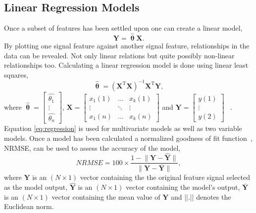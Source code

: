 \documentclass[]{article}
\begin{document}
\subsection{Linear Regression Models}
Once a subset of features has been settled upon one can create a linear model,
\begin{equation} \label{eq:linearModel}
	\mathbf{Y} = \hat{\boldsymbol{\uptheta}} \mathbf{X}.
\end{equation}
By plotting one signal feature against another signal feature, relationships in the data can be revealed. Not only linear relations but quite possibly non-linear relationships too. Calculating a linear regression model is done using linear least squares, 
\begin{equation} \label{eq:regression}
	\hat{\boldsymbol{\uptheta}} = (\mathbf{X}^{\textrm{T}} \mathbf{X})^{-1} \mathbf{X}^{\textrm{T}} \mathbf{Y},
\end{equation}
where $ \hat{\boldsymbol{\uptheta}} = \begin{bmatrix} \hat{\theta_{1}} \\ \vdots \\ \hat{\theta_{n}} \end{bmatrix} $, $ \mathbf{X} = \begin{bmatrix} x_{1}(1) & \hdots & x_{k}(1) \\ \vdots & \ddots & \vdots \\ x_{1}(n) & \hdots & x_{k}(n)  \end{bmatrix}$ and 
$ \mathbf{Y} = \begin{bmatrix} y(1) \\ \vdots \\ y(2)\end{bmatrix}$ ~\cite{james2013introduction}.\\
Equation \ref{eq:regression} is used for multivariate models as well as two variable models. Once a model has been calculated a normalized goodness of fit function~\cite{gonzalez2023time}, \gls{NRMSE}, can be used to assess the accuracy of the model,
\begin{equation}
	NRMSE = 100 \times \frac{ 1 - \lVert\mathbf{Y} - \mathbf{\hat{Y}}\rVert } { \lVert \mathbf{Y} - \mathbf{\bar{Y}} \rVert },
\end{equation}
where $\mathbf{Y}$ is an $(N \times 1)$ vector containing the the original feature signal selected as the model output, $\mathbf{\hat{Y}}$ is an $(N \times 1)$ vector containing the model’s output, $\mathbf{\bar{Y}}$ is an $(N \times 1)$ vector containing the mean value of $\mathbf{Y}$ and ||.|| denotes the Euclidean norm.
\end{document}
